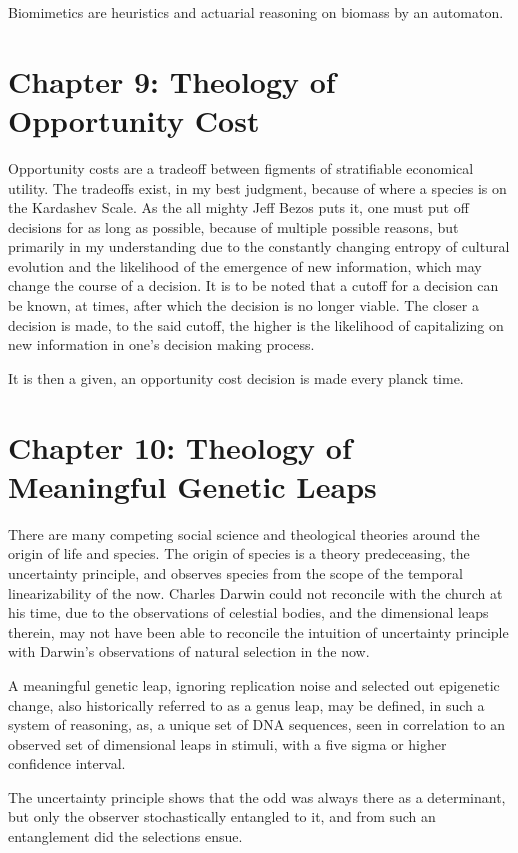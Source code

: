 \documentclass[ebook,12pt,oneside,openany]{memoir}
\begin{document}
\indent Biomimetics are heuristics and actuarial reasoning on biomass by an automaton.
\chapter*{Chapter 9: Theology of Opportunity Cost}


\indent \indent Opportunity costs are a tradeoff between figments of stratifiable economical utility. The tradeoffs exist, in my best judgment, because of where a species is on the Kardashev Scale. As the all mighty Jeff Bezos puts it, one must put off decisions for as long as possible, because of multiple possible reasons, but primarily in my understanding due to the constantly changing entropy of cultural evolution and the likelihood of the emergence of new information, which may change the course of a decision. It is to be noted that a cutoff for a decision can be known, at times, after which the decision is no longer viable. The closer a decision is made, to the said cutoff, the higher is the likelihood of capitalizing on new information in one's decision making process.

\indent It is then a given, an opportunity cost decision is made every planck time.
\chapter*{Chapter 10: Theology of Meaningful Genetic Leaps}


\indent \indent There are many competing social science and theological theories around the origin of life and species. The origin of species is a theory predeceasing, the uncertainty principle, and observes species from the scope of the temporal linearizability of the now. Charles Darwin could not reconcile with the church at his time, due to the observations of celestial bodies, and the dimensional leaps therein, may not have been able to reconcile the intuition of uncertainty principle with Darwin’s observations of natural selection in the now.

\indent A meaningful genetic leap, ignoring replication noise and selected out epigenetic change, also historically referred to as a genus leap, may be defined, in such a system of reasoning, as, a unique set of DNA sequences, seen in correlation to an observed set of dimensional leaps in stimuli, with a five sigma or higher confidence interval.

\indent The uncertainty principle shows that the odd was always there as a determinant, but only the observer stochastically entangled to it, and from such an entanglement did the selections ensue.
\end{document}
